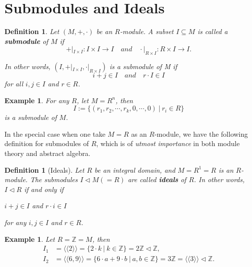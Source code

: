 \documentclass[12pt]{amsbook}
\newtheorem{definition}[theorem]{Definition}
\newtheorem{example}[theorem]{Example}
\begin{document}
\section{Submodules and Ideals}
\begin{definition}
    Let $(M,+,\cdot)$ be an $R$-module. A subset $I \subseteq M$ is called a {\bf submodule} of $M$ if
    $$+|_{I \times I}:I \times I \to I \quad and \quad \cdot |_{R \times I}:R \times I \to I.$$
    
    In other words, $(I, +|_{I \times I}, \cdot|_{R \times I})$ is a submodule of M if
    $$i+j \in I \quad and \quad r \cdot I \in I$$
    for all $i,j \in I$ and $r \in R$.
\end{definition}

\begin{example} 
        For any $R$, let $M=R^{n}$, then 
        $$I:=\{ (r_1,r_2,\cdots,r_k,0,\cdots,0) \ |\ r_i \in R \}$$ 
        is a submodule of $M$.
\end{example}

In the special case when one take $M = R$ as an $R$-module, we have the following definition for submodules of $R$, which is of {\it utmost importance} in both module theory and abstract algebra.

\begin{definition}[Ideals]
    Let $R$ be an integral domain, and $M=R^{1}=R$ is an $R$-module. The submodules $I \lhd M(=R)$ are called {\bf ideals} of $R$. In other words, $I \lhd R$ if and only if 
    \begin{center}
    $i+j \in I$ \quad and  \quad $r \cdot i \in I$ 
    \end{center}
    for any $i,j \in I$ and $r \in R$.
\end{definition}

\begin{example}
    Let $R=\mathbb{Z}=M$, then
    \begin{align*}
        I_1&=\langle \langle 2 \rangle \rangle = \{ 2 \cdot k \ |\ k \in \mathbb{Z} \} = 2 \mathbb{Z} \lhd \mathbb{Z}, \\
        I_2&=\langle \langle 6, 9 \rangle \rangle = \{ 6 \cdot a+9 \cdot b \ |\ a,b \in \mathbb{Z} \} = 3 \mathbb{Z} = \langle \langle 3 \rangle \rangle \lhd \mathbb{Z}.
    \end{align*}
\end{example}
\end{document}
